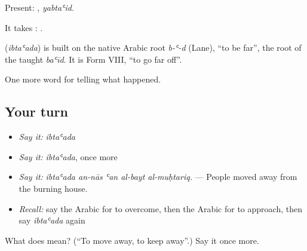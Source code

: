 Present: , \emph{yabtaʿid}.

It takes :  .

\begin{cousinweb}
\textbf{} (\emph{ibtaʿada}) is built on the native Arabic root \emph{b-ʿ-d} (Lane), \textquotedblleft{}to be far\textquotedblright{}, the root of the taught \emph{baʿīd}. It is Form VIII, \textquotedblleft{}to go far off\textquotedblright{}.
\end{cousinweb}

\begin{grammarlens}[title={What you've built}]
One more word for telling what happened.
\end{grammarlens}

\subsection*{Your turn}
\begin{itemize}
\raggedright
  \item \emph{Say it:} \emph{ibtaʿada}
  \item \emph{Say it:} \emph{ibtaʿada}, once more
  \item \emph{Say it:} \emph{ibtaʿada an-nās ʿan al-bayt al-muḥtariq.} — People moved away from the burning house.
  \item \emph{Recall:} say the Arabic for to overcome, then the Arabic for to approach, then say \emph{ibtaʿada} again
\end{itemize}

\begin{tcolorbox}[breakable,colback=teal!4,colframe=teal!35!black,title={Before you move on}]
What does  mean? (\textquotedblleft{}To move away, to keep away\textquotedblright{}.) Say it once more.
\end{tcolorbox}
